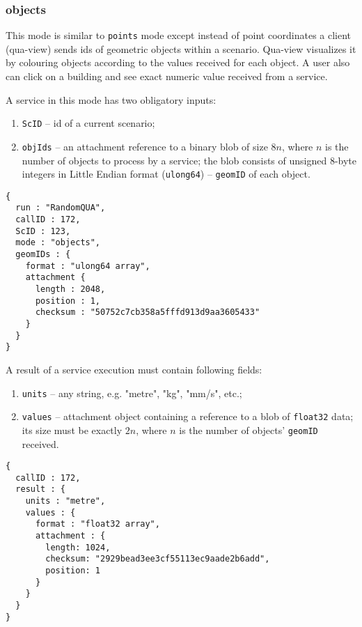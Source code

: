 \subsubsection{objects}

This mode is similar to \texttt{points} mode except instead of point coordinates a client (qua-view) sends ids of geometric objects
within a scenario.
Qua-view visualizes it by colouring objects according to the values received for each object.
A user also can click on a building and see exact numeric value received from a service.

A service in this mode has two obligatory inputs:
\begin{enumerate}
\item \texttt{ScID} -- id of a current scenario;
\item \texttt{objIds} -- an attachment reference to a binary blob of size $8n$, where $n$ is the number of objects to process by a service;
                         the blob consists of unsigned 8-byte integers in Little Endian format (\texttt{ulong64}) -- \texttt{geomID} of each object.
\end{enumerate}
\begin{lstlisting}[caption={A qua-compliant service run request for mode \texttt{objects}}, label={lst:quacompliantinput:objects}]
{
  run : "RandomQUA",
  callID : 172,
  ScID : 123,
  mode : "objects",
  geomIDs : {
    format : "ulong64 array",
    attachment {
      length : 2048,
      position : 1,
      checksum : "50752c7cb358a5fffd913d9aa3605433"
    }
  }
}
\end{lstlisting}

A result of a service execution must contain following fields:
\begin{enumerate}
\item \texttt{units} -- any string, e.g. "metre", "kg", "mm/s", etc.;
\item \texttt{values} -- attachment object containing a reference to a blob of \texttt{float32} data;
 its size must be exactly $2 n$, where $n$ is the number of objects' \texttt{geomID} received.
\end{enumerate}
\begin{lstlisting}[caption={A qua-compliant service output for mode \texttt{objects}}, label={lst:quacompliantresult:objects}]
{
  callID : 172,
  result : {
    units : "metre",
    values : {
      format : "float32 array",
      attachment : {
        length: 1024,
        checksum: "2929bead3ee3cf55113ec9aade2b6add",
        position: 1
      }
    }
  }
}
\end{lstlisting}

